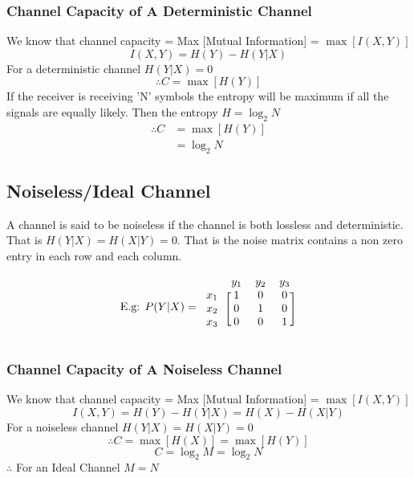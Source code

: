 \documentclass[12pt]{article}
\begin{document}
\subsubsection{Channel Capacity of A Deterministic Channel}
We know that channel capacity = Max [Mutual Information] = $\max [I(X,Y)]$ 
$$I(X,Y) = H(Y) - H(Y|X)$$ 
For a deterministic channel $H(Y|X) = 0$ 
$$\therefore C = \max [H(Y)]$$ 
If the receiver is receiving 'N' symbols the entropy will be maximum if all the signals are equally likely. Then the entropy $H = \log_2 N$ 
\begin{align*}
\therefore C &= \max [H(Y)] \\
&= \log_2 N
\end{align*} 

\subsection{Noiseless/Ideal Channel}
A channel is said to be noiseless if the channel is both lossless and deterministic. That is $H(Y|X) = H(X|Y) = 0$. 
That is the noise matrix contains a non zero entry in each row and each column. 

\begin{minipage}{.3\linewidth}
$$\text{E.g: } P(Y|X) = \begin{blockarray}{cccc}
 & y_1 & y_2 & y_3 \\
\begin{block}{c[ccc]}
x_1 & 1 & 0 & 0 \\ 
x_2 & 0 & 1 & 0 \\ 
x_3 & 0 & 0 & 1 \\
\end{block}
\end{blockarray}$$
\end{minipage}%
\hfill
\begin{minipage}{.5\linewidth}
\centering
{}
\end{minipage}

\subsubsection{Channel Capacity of A Noiseless Channel}
We know that channel capacity = Max [Mutual Information] = $\max [I(X,Y)]$ 
$$I(X,Y) = H(Y) - H(Y|X) = H(X) - H(X|Y)$$ 
For a noiseless channel $H(Y|X) = H(X|Y) = 0$ 
$$\therefore C = \max [H(X)] = \max [H(Y)]$$ 
$$C = \log_2 M = \log_2 N$$ 
$\therefore$ For an Ideal Channel $M = N$ 
\end{document}
